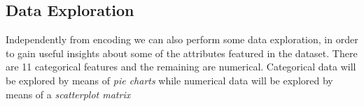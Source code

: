 \subsection{Data Exploration}
Independently from encoding we can also perform some data exploration, in order to gain useful insights about some of the attributes featured in the dataset. There are 11 categorical features and the remaining are numerical. Categorical data will be explored by means of \textit{pie charts} while numerical data will be explored by means of a \textit{scatterplot matrix}

\begin{figure}[H]
    \centering
    \qquad
    \qquad
\end{figure}

